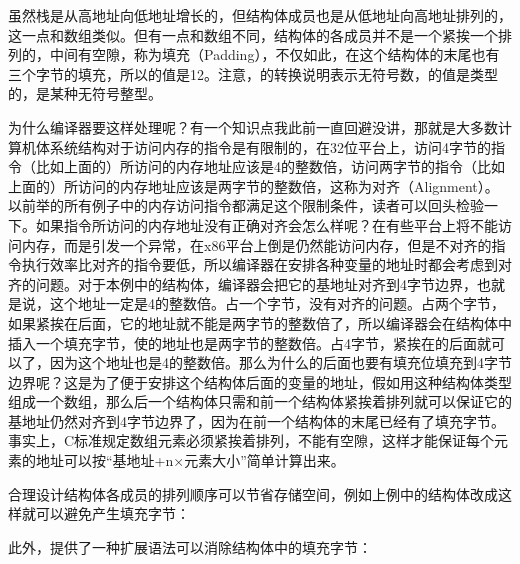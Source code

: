 虽然栈是从高地址向低地址增长的，但结构体成员也是从低地址向高地址排列的，这一点和数组类似。但有一点和数组不同，结构体的各成员并不是一个紧挨一个排列的，中间有空隙，称为填充（Padding），不仅如此，在这个结构体的末尾也有三个字节的填充，所以的值是12。注意，的转换说明表示无符号数，的值是类型的，是某种无符号整型。



为什么编译器要这样处理呢？有一个知识点我此前一直回避没讲，那就是大多数计算机体系统结构对于访问内存的指令是有限制的，在32位平台上，访问4字节的指令（比如上面的）所访问的内存地址应该是4的整数倍，访问两字节的指令（比如上面的）所访问的内存地址应该是两字节的整数倍，这称为对齐（Alignment）。以前举的所有例子中的内存访问指令都满足这个限制条件，读者可以回头检验一下。如果指令所访问的内存地址没有正确对齐会怎么样呢？在有些平台上将不能访问内存，而是引发一个异常，在x86平台上倒是仍然能访问内存，但是不对齐的指令执行效率比对齐的指令要低，所以编译器在安排各种变量的地址时都会考虑到对齐的问题。对于本例中的结构体，编译器会把它的基地址对齐到4字节边界，也就是说，这个地址一定是4的整数倍。占一个字节，没有对齐的问题。占两个字节，如果紧挨在后面，它的地址就不能是两字节的整数倍了，所以编译器会在结构体中插入一个填充字节，使的地址也是两字节的整数倍。占4字节，紧挨在的后面就可以了，因为这个地址也是4的整数倍。那么为什么的后面也要有填充位填充到4字节边界呢？这是为了便于安排这个结构体后面的变量的地址，假如用这种结构体类型组成一个数组，那么后一个结构体只需和前一个结构体紧挨着排列就可以保证它的基地址仍然对齐到4字节边界了，因为在前一个结构体的末尾已经有了填充字节。事实上，C标准规定数组元素必须紧挨着排列，不能有空隙，这样才能保证每个元素的地址可以按“基地址+n×\BookSplit{}元素大小”简单计算出来。



合理设计结构体各成员的排列顺序可以节省存储空间，例如上例中的结构体改成这样就可以避免产生填充字节：




此外，提供了一种扩展语法可以消除结构体中的填充字节：




